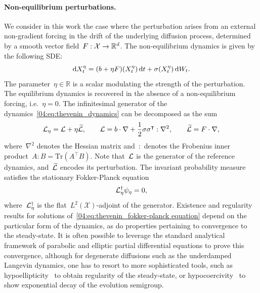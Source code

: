 \paragraph{Non-equilibrium perturbations.}\label{04:par:neq}
We consider in this work the case where the perturbation arises from an external non-gradient forcing in the drift of the underlying diffusion process, determined by a smooth vector field~$F:\mathcal{X}\to \mathbb{R}^d$.
The non-equilibrium dynamics is given by the following SDE:
\begin{equation}
    \label{04:eq:thevenin_dynamics}
    \mathrm{d} X^\eta_t = (b+\eta F)(X^\eta_t)\,\mathrm{d} t +\sigma(X^\eta_t)\,\mathrm{d} W_t.
\end{equation}
The parameter~$\eta\in\mathbb R$ is a scalar modulating the strength of the perturbation.
The equilibrium dynamics is recovered in the absence of a non-equilibrium forcing, i.e.~$\eta=0$.
The infinitesimal generator of the dynamics~\eqref{04:eq:thevenin_dynamics} can be decomposed as the sum
\begin{equation}
    \label{04:eq:thevenin_generator_nemd}\mathcal{L}_\eta=\mathcal{L}+\eta \widetilde{\mathcal{L}},\qquad \mathcal{L}=b \cdot \nabla + \frac12\sigma  \sigma^\intercal : \nabla ^2,\qquad \widetilde{\mathcal{L}}=F\cdot \nabla,
\end{equation}
where~$\nabla^2$ denotes the Hessian matrix and~$:$ denotes the Frobenius inner product~$A:B=\mathrm{Tr}(A^\intercal B)$. 
Note that~$\mathcal{L}$ is the generator of the reference dynamics, and~$\widetilde{\mathcal{L}}$ encodes its perturbation.
The invariant probability measure satisfies the stationary Fokker-Planck equation
\begin{equation}
    \label{04:eq:thevenin_fokker-planck equation}
    \mathcal{L}_\eta^{\dagger} \psi_\eta = 0,
\end{equation}
where~$\mathcal{L}_\eta^{\dagger}$ is the flat~$L^2(\mathcal X)$-adjoint of the generator. Existence and regularity results for solutions of~\eqref{04:eq:thevenin_fokker-planck equation} depend on the particular form of the dynamics, as do properties pertaining to convergence to the steady-state. It is often possible to leverage the standard analytical framework of parabolic and elliptic partial differential equations to prove this convergence, although for degenerate diffusions such as the underdamped Langevin dynamics, one has to resort to more sophisticated tools, such as hypoellipticity~\cite{H67} to obtain regularity of the steady-state, or hypocoercivity~\cite{V06} to show exponential decay of the evolution semigroup.

